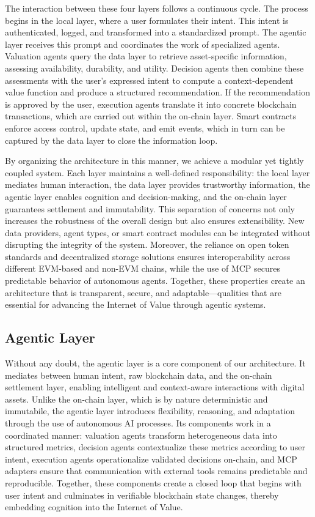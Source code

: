 The interaction between these four layers follows a continuous cycle. The process begins in the local layer, where a user formulates their intent. This intent is authenticated, logged, and transformed into a standardized prompt. The agentic layer receives this prompt and coordinates the work of specialized agents. Valuation agents query the data layer to retrieve asset-specific information, assessing availability, durability, and utility. Decision agents then combine these assessments with the user’s expressed intent to compute a context-dependent value function and produce a structured recommendation. If the recommendation is approved by the user, execution agents translate it into concrete blockchain transactions, which are carried out within the on-chain layer. Smart contracts enforce access control, update state, and emit events, which in turn can be captured by the data layer to close the information loop.

By organizing the architecture in this manner, we achieve a modular yet tightly coupled system. Each layer maintains a well-defined responsibility: the local layer mediates human interaction, the data layer provides trustworthy information, the agentic layer enables cognition and decision-making, and the on-chain layer guarantees settlement and immutability. This separation of concerns not only increases the robustness of the overall design but also ensures extensibility. New data providers, agent types, or smart contract modules can be integrated without disrupting the integrity of the system. Moreover, the reliance on open token standards and decentralized storage solutions ensures interoperability across different EVM-based and non-EVM chains, while the use of MCP secures predictable behavior of autonomous agents. Together, these properties create an architecture that is transparent, secure, and adaptable—qualities that are essential for advancing the Internet of Value through agentic systems.


\subsection{Agentic Layer}

Without any doubt, the agentic layer is a core component of our architecture. It mediates between human intent, raw blockchain data, and the on-chain settlement layer, enabling intelligent and context-aware interactions with digital assets. Unlike the on-chain layer, which is by nature deterministic and immutabile, the agentic layer introduces flexibility, reasoning, and adaptation through the use of autonomous AI processes. Its components work in a coordinated manner: valuation agents transform heterogeneous data into structured metrics, decision agents contextualize these metrics according to user intent, execution agents operationalize validated decisions on-chain, and MCP adapters ensure that communication with external tools remains predictable and reproducible. Together, these components create a closed loop that begins with user intent and culminates in verifiable blockchain state changes, thereby embedding cognition into the Internet of Value.

